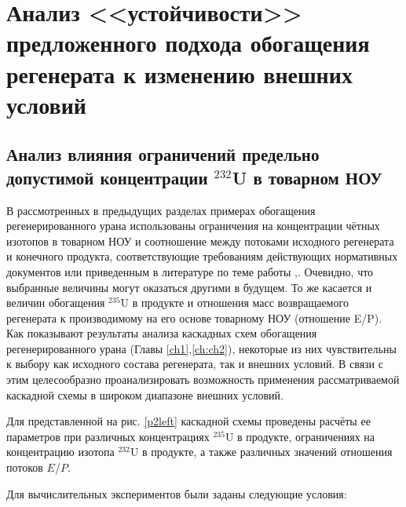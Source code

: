 \section{Анализ <<устойчивости>> предложенного подхода обогащения регенерата к изменению внешних условий}
\subsection{Анализ влияния ограничений предельно допустимой концентрации $^{232}$U в товарном НОУ}

В рассмотренных в предыдущих разделах примерах обогащения регенерированного урана использованы ограничения на концентрации чётных изотопов в товарном НОУ и соотношение между потоками исходного регенерата и конечного продукта, соответствующие требованиям действующих нормативных документов или приведенным в литературе по теме работы \cite{smirnovEvolutionIsotopicComposition2012},\cite{smirnovKaskadnyeShemyZadachah2012}. Очевидно, что выбранные величины могут оказаться другими в будущем. То же касается и величин обогащения $^{235}$U в продукте и отношения масс возвращаемого регенерата к производимому на его основе товарному НОУ (отношение E/P). Как показывают результаты анализа каскадных схем обогащения регенерированного урана (Главы \ref{ch1},\ref{ch:ch2}), некоторые из них чувствительны к выбору как исходного состава регенерата, так и внешних условий. В связи с этим целесообразно проанализировать возможность применения рассматриваемой каскадной схемы в широком диапазоне внешних условий.

Для представленной на рис. \ref{p2left} каскадной схемы проведены расчёты ее параметров при различных концентрациях $^{235}$U в продукте, ограничениях на концентрацию изотопа $^{232}$U в продукте, а также различных значений отношения потоков $E$/$P$.

Для вычислительных экспериментов были заданы следующие условия:

